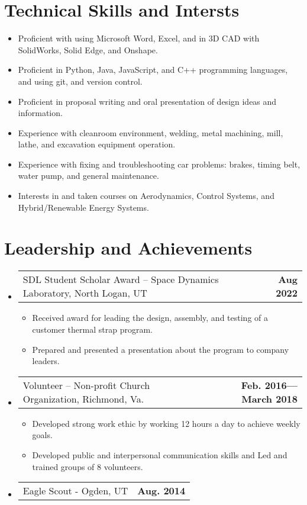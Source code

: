 \documentclass[letterpaper,11pt]{article}
\makeatletter
\newcommand{\resumeProjectHeading}[2]{
    \vspace{-6pt}
    \item
    \begin{tabular*}{1.0\textwidth}{l@{\extracolsep{\fill}}r}
      \small#1 & \textbf{\small #2}\\
    \end{tabular*}\vspace{-11pt}
}
\newcommand{\resumeSubHeadingListStart}{\begin{itemize}[leftmargin=0.0in, label={}]}
\newcommand{\resumeSubHeadingListEnd}{\end{itemize}}
\newcommand{\resumeItemListStart}{\begin{itemize}}
\newcommand{\resumeItemListEnd}{\end{itemize}\vspace{-5pt}}
\newcommand{\resumeItem}[1]{ 
  \item\small{
    {#1 \vspace{-5pt}}
  }
}
\makeatother
\begin{document}
\section{Technical Skills and Intersts}
    \resumeItemListStart{}
        \resumeItem{Proficient with using Microsoft Word, Excel, and in 3D CAD with SolidWorks, Solid Edge, and Onshape.} \vspace{-4.5pt}
        \resumeItem{Proficient in Python, Java, JavaScript, and C++ programming languages, and using git, and version control.} \vspace{-4.5pt}
        \resumeItem{Proficient in proposal writing and oral presentation of design ideas and information.} \vspace{-4.5pt}
        \resumeItem{Experience with cleanroom environment, welding, metal machining, mill, lathe, and excavation equipment operation.} \vspace{-4.5pt}
        \resumeItem{Experience with fixing and troubleshooting car problems: brakes, timing belt, water pump, and general maintenance.} \vspace{-4.5pt}
        \resumeItem{Interests in and taken courses on Aerodynamics, Control Systems, and Hybrid/Renewable Energy Systems.} \vspace{-4.5pt}
    \resumeItemListEnd{}
 
\vspace{-8pt}

\section{Leadership and Achievements }
    \resumeSubHeadingListStart{}
    \resumeProjectHeading{SDL Student Scholar Award – Space Dynamics Laboratory, North Logan, UT	}{Aug 2022}
      \resumeItemListStart{}
        \resumeItem{Received award for leading the design, assembly, and testing of a customer thermal strap program.}
        \resumeItem{Prepared and presented a presentation about the program to company leaders.}
      \resumeItemListEnd{}
    \resumeProjectHeading{Volunteer – Non-profit Church Organization, Richmond, Va.}{Feb. 2016—March 2018}
      \resumeItemListStart{}
        \resumeItem{Developed strong work ethic by working 12 hours a day to achieve weekly goals.}
        \resumeItem{Developed public and interpersonal communication skills and Led and trained groups of 8 volunteers.}
      \resumeItemListEnd{}
    \resumeProjectHeading{Eagle Scout - Ogden, UT}{Aug. 2014}

    \resumeSubHeadingListEnd{}
\vspace{-16pt}
\end{document}
